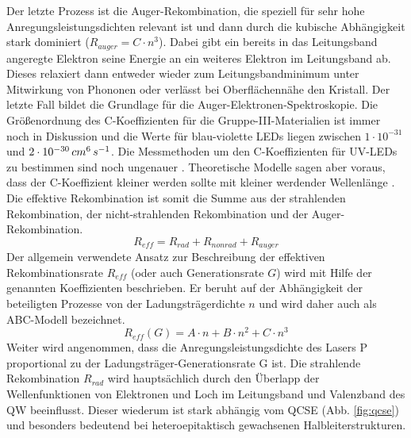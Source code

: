 \newline
Der letzte Prozess ist die Auger-Rekombination, die speziell für sehr hohe Anregungsleistungsdichten relevant ist und dann durch die kubische Abhängigkeit stark dominiert ($R_{auger} = C \cdot n^3 $). Dabei gibt ein bereits in das Leitungsband angeregte Elektron seine Energie an ein weiteres Elektron im Leitungsband ab. Dieses relaxiert dann entweder wieder zum Leitungsbandminimum unter Mitwirkung von Phononen oder verlässt bei Oberflächennähe den Kristall. Der letzte Fall bildet die Grundlage für die Auger-Elektronen-Spektroskopie.
Die Größenordnung des C-Koeffizienten für die Gruppe-III-Materialien ist immer noch in Diskussion \cite{8b1c5cf85d5a45e0ae9acca7b03dc349} \cite{doi:10.1063/1.2785135} \cite{doi:10.1002/pssc.200880950} und die Werte für blau-violette LEDs liegen zwischen $1 \cdot 10^{-31}$ und $2 \cdot 10^{-30} \thinspace cm^6 \thinspace s^{-1}$. Die Messmethoden um den C-Koeffizienten für UV-LEDs zu bestimmen sind noch ungenauer \cite{1882-0786-8-2-022104}. Theoretische Modelle sagen aber voraus, dass der C-Koeffizient kleiner werden sollte mit kleiner werdender Wellenlänge \cite{doi:10.1063/1.3570656}.
\newline
Die effektive Rekombination ist somit die Summe aus der strahlenden Rekombination, der nicht-strahlenden Rekombination und der Auger-Rekombination.
\begin{equation}
    R_{eff} = R_{rad} + R_{nonrad} + R_{auger}
    \label{eq:iqe1}
\end{equation}
Der allgemein verwendete Ansatz zur Beschreibung der effektiven Rekombinationsrate $R_{eff}$ (oder auch Generationsrate $G$) wird mit Hilfe der genannten Koeffizienten beschrieben. Er beruht auf der Abhängigkeit der beteiligten Prozesse von der Ladungsträgerdichte $n$ und wird daher auch als ABC-Modell bezeichnet.
\begin{equation}
    R_{eff} (G) = A \cdot n + B \cdot n^2 + C \cdot n^3 
    \label{eq:iqe2}
\end{equation}
Weiter wird angenommen, dass die Anregungsleistungsdichte des Lasers P proportional zu
der Ladungsträger-Generationsrate G ist. Die strahlende Rekombination $R_{rad}$ wird hauptsächlich durch den Überlapp der Wellenfunktionen von Elektronen und Loch im Leitungsband und Valenzband des QW beeinflusst. Dieser wiederum ist stark abhängig vom QCSE (Abb. 
\ref{fig:qcse}) und besonders bedeutend bei heteroepitaktisch gewachsenen Halbleiterstrukturen. 
%
